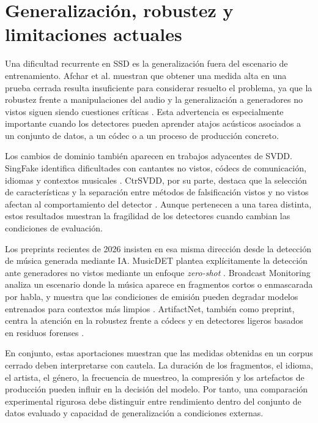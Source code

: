 \section{Generalización, robustez y limitaciones actuales}

Una dificultad recurrente en SSD es la generalización fuera del escenario de entrenamiento. Afchar et al. muestran que obtener una medida alta en una prueba cerrada resulta insuficiente para considerar resuelto el problema, ya que la robustez frente a manipulaciones del audio y la generalización a generadores no vistos siguen siendo cuestiones críticas \cite{afchar2025challenges}. Esta advertencia es especialmente importante cuando los detectores pueden aprender atajos acústicos asociados a un conjunto de datos, a un códec o a un proceso de producción concreto.

Los cambios de dominio también aparecen en trabajos adyacentes de SVDD. SingFake identifica dificultades con cantantes no vistos, códecs de comunicación, idiomas y contextos musicales \cite{zang2023singfake}. CtrSVDD, por su parte, destaca que la selección de características y la separación entre métodos de falsificación vistos y no vistos afectan al comportamiento del detector \cite{zang2024ctrsvdd}. Aunque pertenecen a una tarea distinta, estos resultados muestran la fragilidad de los detectores cuando cambian las condiciones de evaluación.

Los preprints recientes de 2026 insisten en esa misma dirección desde la detección de música generada mediante IA. MusicDET plantea explícitamente la detección ante generadores no vistos mediante un enfoque \textit{zero-shot} \cite{han2026musicdet}. Broadcast Monitoring analiza un escenario donde la música aparece en fragmentos cortos o enmascarada por habla, y muestra que las condiciones de emisión pueden degradar modelos entrenados para contextos más limpios \cite{lopezayala2026broadcast}. ArtifactNet, también como preprint, centra la atención en la robustez frente a códecs y en detectores ligeros basados en residuos forenses \cite{oh2026artifactnet}.

En conjunto, estas aportaciones muestran que las medidas obtenidas en un corpus cerrado deben interpretarse con cautela. La duración de los fragmentos, el idioma, el artista, el género, la frecuencia de muestreo, la compresión y los artefactos de producción pueden influir en la decisión del modelo. Por tanto, una comparación experimental rigurosa debe distinguir entre rendimiento dentro del conjunto de datos evaluado y capacidad de generalización a condiciones externas.

